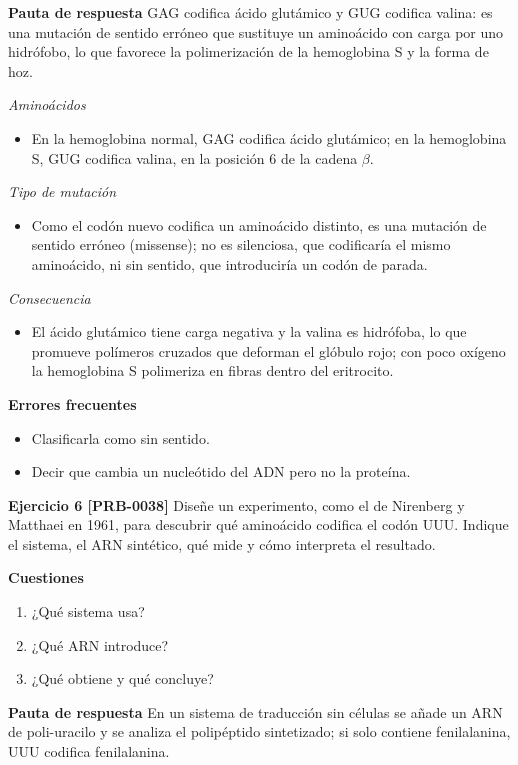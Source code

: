 \documentclass{book}
\begin{document}
\noindent\textbf{Pauta de respuesta}
GAG codifica ácido glutámico y GUG codifica valina: es una mutación de sentido erróneo que sustituye un aminoácido con carga por uno hidrófobo, lo que favorece la polimerización de la hemoglobina S y la forma de hoz.


\noindent\textit{Aminoácidos}
\begin{itemize}
\item En la hemoglobina normal, GAG codifica ácido glutámico; en la hemoglobina S, GUG codifica valina, en la posición 6 de la cadena \(\beta\).
\end{itemize}

\noindent\textit{Tipo de mutación}
\begin{itemize}
\item Como el codón nuevo codifica un aminoácido distinto, es una mutación de sentido erróneo (missense); no es silenciosa, que codificaría el mismo aminoácido, ni sin sentido, que introduciría un codón de parada.
\end{itemize}

\noindent\textit{Consecuencia}
\begin{itemize}
\item El ácido glutámico tiene carga negativa y la valina es hidrófoba, lo que promueve polímeros cruzados que deforman el glóbulo rojo; con poco oxígeno la hemoglobina S polimeriza en fibras dentro del eritrocito.
\end{itemize}

\noindent\textbf{Errores frecuentes}
\begin{itemize}
\item Clasificarla como sin sentido.
\item Decir que cambia un nucleótido del ADN pero no la proteína.
\end{itemize}

\noindent\textbf{Ejercicio 6 [PRB-0038]}
Diseñe un experimento, como el de Nirenberg y Matthaei en 1961, para descubrir qué aminoácido codifica el codón UUU. Indique el sistema, el ARN sintético, qué mide y cómo interpreta el resultado.


\noindent\textbf{Cuestiones}
\begin{enumerate}
\item ¿Qué sistema usa?
\item ¿Qué ARN introduce?
\item ¿Qué obtiene y qué concluye?
\end{enumerate}

\noindent\textbf{Pauta de respuesta}
En un sistema de traducción sin células se añade un ARN de poli-uracilo y se analiza el polipéptido sintetizado; si solo contiene fenilalanina, UUU codifica fenilalanina.
\end{document}
